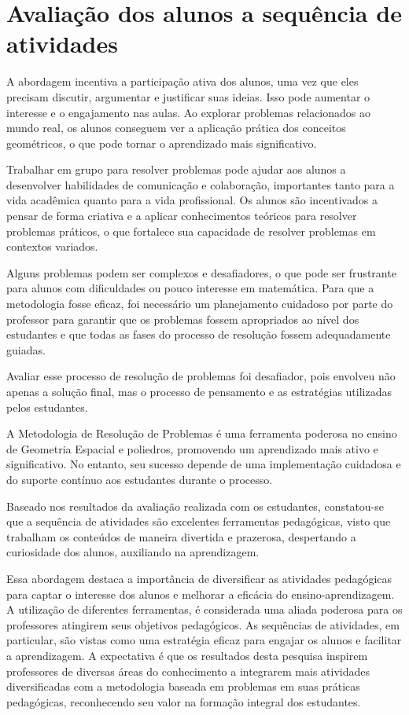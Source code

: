\section{Avaliação dos alunos a sequência de atividades}

A abordagem incentiva a participação ativa dos alunos, uma vez que eles precisam discutir, argumentar e justificar suas ideias. Isso pode aumentar o interesse e o engajamento nas aulas. Ao explorar problemas relacionados ao mundo real, os alunos conseguem ver a aplicação prática dos conceitos geométricos, o que pode tornar o aprendizado mais significativo.

Trabalhar em grupo para resolver problemas pode ajudar aos alunos a desenvolver habilidades de comunicação e colaboração, importantes tanto para a vida acadêmica quanto para a vida profissional. Os alunos são incentivados a pensar de forma criativa e a aplicar conhecimentos teóricos para resolver problemas práticos, o que fortalece sua capacidade de resolver problemas em contextos variados.

Alguns problemas podem ser complexos e desafiadores, o que pode ser frustrante para alunos com dificuldades ou pouco interesse em matemática. Para que a metodologia fosse eficaz, foi necessário um planejamento cuidadoso por parte do professor para garantir que os problemas fossem apropriados ao nível dos estudantes e que todas as fases do processo de resolução fossem adequadamente guiadas.

Avaliar esse processo de resolução de problemas foi desafiador, pois envolveu não apenas a solução final, mas o processo de pensamento e as estratégias utilizadas pelos estudantes.

A Metodologia de Resolução de Problemas é uma ferramenta poderosa no ensino de Geometria Espacial e poliedros, promovendo um aprendizado mais ativo e significativo. No entanto, seu sucesso depende de uma implementação cuidadosa e do suporte contínuo aos estudantes durante o processo.

Baseado nos resultados da avaliação realizada com os estudantes, constatou-se que a sequência de atividades são excelentes ferramentas pedagógicas, visto que trabalham os conteúdos de maneira divertida e prazerosa, despertando a curiosidade dos alunos, auxiliando na aprendizagem.

Essa abordagem destaca a importância de diversificar as atividades pedagógicas para captar o interesse dos alunos e melhorar a eficácia do ensino-aprendizagem. A utilização de diferentes ferramentas, é considerada uma aliada poderosa para os professores atingirem seus objetivos pedagógicos. As sequências de atividades, em particular, são vistas como uma estratégia eficaz para engajar os alunos e facilitar a aprendizagem. A expectativa é que os resultados desta pesquisa inspirem professores de diversas áreas do conhecimento a integrarem mais atividades diversificadas com a metodologia baseada em problemas em suas práticas pedagógicas, reconhecendo seu valor na formação integral dos estudantes.

